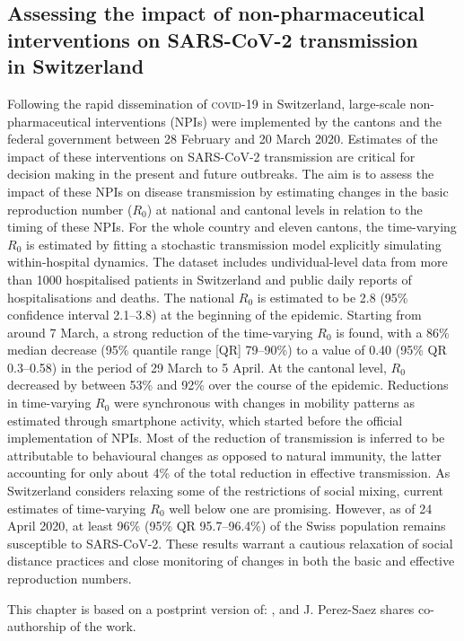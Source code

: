 \begin{fullwidth}
\chapter[Assessing the impact of non-pharmaceutical interventions on SARS-CoV-2 transmission in Switzerland]{Assessing the impact of non-pharmaceutical\\ interventions on SARS-CoV-2 transmission\\ in Switzerland}
\label{ch:covid-switzerland-npi}

Following the rapid dissemination of \textsc{covid}-19 in Switzerland, large-scale non-pharmaceutical interventions (NPIs) were implemented by the cantons and the federal government between 28 February and 20 March 2020. Estimates of the impact of these interventions on SARS-CoV-2 transmission are critical for decision making in the present and future outbreaks. The aim is to assess the impact of these NPIs on disease transmission by estimating changes in the basic reproduction number ($R_0$) at national and cantonal levels in relation to the timing of these NPIs. For the whole country and eleven cantons, the time-varying $R_0$ is estimated by fitting a stochastic transmission model explicitly simulating within-hospital dynamics. The dataset includes undividual-level data from more than 1000 hospitalised patients in Switzerland and public daily reports of hospitalisations and deaths. The national $R_0$ is estimated to be 2.8 (95\% confidence interval 2.1–3.8) at the beginning of the epidemic. Starting from around 7 March, a strong reduction of the time-varying $R_0$ is found, with a 86\% median decrease (95\% quantile range [QR] 79–90\%) to a value of 0.40 (95\% QR 0.3–0.58) in the period of 29 March to 5 April. At the cantonal level, $R_0$ decreased by between 53\% and 92\% over the course of the epidemic. Reductions in time-varying $R_0$ were synchronous with changes in mobility patterns as estimated through smartphone activity, which started before the official implementation of NPIs. Most of the reduction of transmission is inferred to be attributable to behavioural changes as opposed to natural immunity, the latter accounting for only about 4\% of the total reduction in effective transmission. As Switzerland considers relaxing some of the restrictions of social mixing, current estimates of time-varying $R_0$ well below one are promising. However, as of 24 April 2020, at least 96\% (95\% QR 95.7–96.4\%) of the Swiss population remains susceptible to SARS-CoV-2. These results warrant a cautious relaxation of social distance practices and close monitoring of changes in both the basic and effective reproduction numbers.

This chapter is based on a postprint version of:
, and J. Perez-Saez shares co-authorship of the work.
\end{fullwidth}

